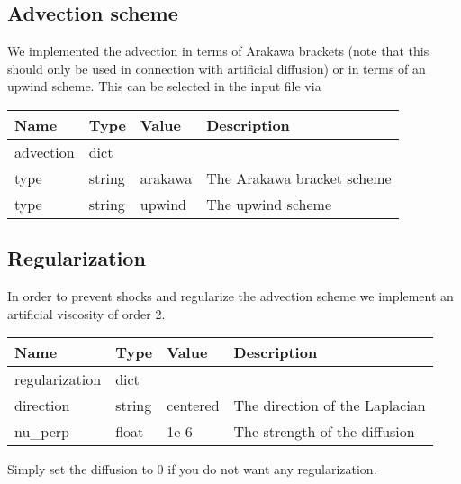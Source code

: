 \subsection{Advection scheme}
We implemented the advection in terms of Arakawa brackets
(note that this should only be used in connection with artificial diffusion)
or in terms of an upwind scheme.
This can be selected in the input file via
\begin{longtable}{llll}
\toprule
\rowcolor{gray!50}\textbf{Name} &  \textbf{Type} & \textbf{Value}  & \textbf{Description}  \\ \midrule
advection & dict & & \\
\qquad type & string & arakawa & The Arakawa bracket scheme \\
\qquad type & string & upwind  & The upwind scheme \\
\bottomrule
\end{longtable}
\subsection{Regularization}
In order to prevent shocks and regularize the advection scheme
we implement an artificial viscosity of order 2.
\begin{longtable}{llll}
\toprule
\rowcolor{gray!50}\textbf{Name} &  \textbf{Type} & \textbf{Value}  & \textbf{Description}  \\ \midrule
regularization & dict & & \\
\qquad direction & string & centered & The direction of the Laplacian \\
\qquad nu\_perp & float & 1e-6  &  The strength of the diffusion \\
\bottomrule
\end{longtable}
Simply set the diffusion to 0 if you do not want any regularization.

